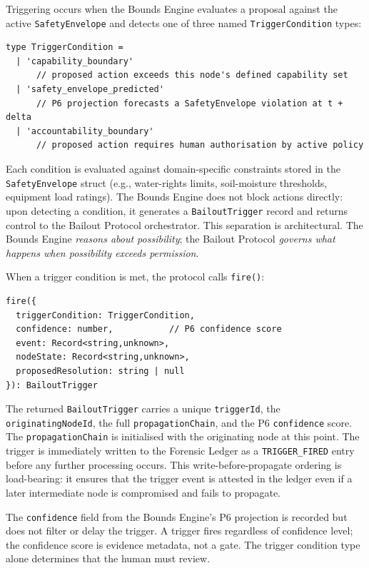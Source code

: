 Triggering occurs when the Bounds Engine evaluates a proposal against the
active \texttt{SafetyEnvelope} and detects one of three named
\texttt{TriggerCondition} types:

\begin{verbatim}
type TriggerCondition =
  | 'capability_boundary'
      // proposed action exceeds this node's defined capability set
  | 'safety_envelope_predicted'
      // P6 projection forecasts a SafetyEnvelope violation at t + delta
  | 'accountability_boundary'
      // proposed action requires human authorisation by active policy
\end{verbatim}

Each condition is evaluated against domain-specific constraints stored in the
\texttt{SafetyEnvelope} struct (e.g., water-rights limits, soil-moisture
thresholds, equipment load ratings).  The Bounds Engine does not block actions
directly: upon detecting a condition, it generates a \texttt{BailoutTrigger}
record and returns control to the Bailout Protocol orchestrator.  This
separation is architectural.  The Bounds Engine \emph{reasons about possibility};
the Bailout Protocol \emph{governs what happens when possibility exceeds
permission}.

When a trigger condition is met, the protocol calls \texttt{fire()}:

\begin{verbatim}
fire({
  triggerCondition: TriggerCondition,
  confidence: number,           // P6 confidence score
  event: Record<string,unknown>,
  nodeState: Record<string,unknown>,
  proposedResolution: string | null
}): BailoutTrigger
\end{verbatim}

The returned \texttt{BailoutTrigger} carries a unique \texttt{triggerId}, the
\texttt{originatingNodeId}, the full \texttt{propagationChain}, and the
P6 \texttt{confidence} score.  The \texttt{propagationChain} is initialised
with the originating node at this point.  The trigger is immediately written
to the Forensic Ledger as a \texttt{TRIGGER\_FIRED} entry before any further
processing occurs.  This write-before-propagate ordering is load-bearing: it
ensures that the trigger event is attested in the ledger even if a later
intermediate node is compromised and fails to propagate.

The \texttt{confidence} field from the Bounds Engine's P6 projection is
recorded but does not filter or delay the trigger.  A trigger fires regardless
of confidence level; the confidence score is evidence metadata, not a
gate.  The trigger condition type alone determines that the human must review.

